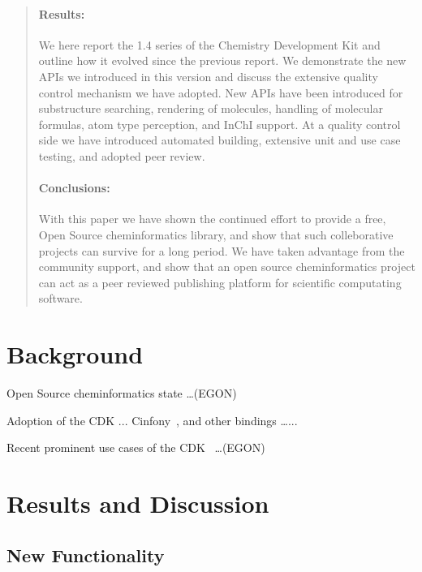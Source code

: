 \documentclass[10pt]{bmc_article}
\newenvironment{bmcformat}{\begin{raggedright}\baselineskip20pt\sloppy\setboolean{publ}{false}}{\end{raggedright}\baselineskip20pt\sloppy}
\begin{document}
\begin{bmcformat}
\begin{abstract}
\paragraph*{Results:}
We here report the 1.4 series of the Chemistry Development Kit and outline how
it evolved since the previous report. We demonstrate the new APIs we introduced
in this version and discuss the extensive quality control mechanism we have
adopted. New APIs have been introduced for substructure searching, rendering of
molecules, handling of molecular formulas, atom type perception, and InChI
support. At a quality control side we have introduced automated building,
extensive unit and use case testing, and adopted peer review.
\paragraph*{Conclusions:}
With this paper we have shown the continued effort to provide a free, Open Source
cheminformatics library, and show that such colleborative projects can survive for
a long period. We have taken advantage from the community support, and show
that an open source cheminformatics project can act as a peer reviewed
publishing platform for scientific computating software.
\end{abstract}




\section*{Background}

Open Source cheminformatics state \ldots (EGON)

Adoption of the CDK ... Cinfony~\cite{OBoyle2008}, and other bindings \ldots ...

Recent prominent use cases of the CDK~\cite{Steinbeck2003,Steinbeck2006} \ldots (EGON)

 
\section*{Results and Discussion}

\subsection*{New Functionality}


\end{bmcformat}
\end{document}
